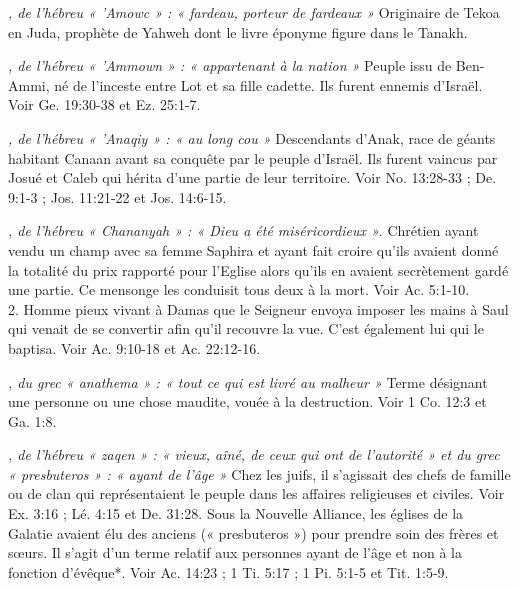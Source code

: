 \begin{multicols}{2}
{\textit{, de l'hébreu « 'Amowc » : « fardeau, porteur de fardeaux »}\newline
Originaire de Tekoa en Juda, prophète de Yahweh dont le livre éponyme figure dans le Tanakh.

\textit{, de l'hébreu « 'Ammown » : « appartenant à la nation »}\newline
Peuple issu de Ben-Ammi, né de l'inceste entre Lot et sa fille cadette. Ils furent ennemis d'Israël. Voir Ge. 19:30-38 et Ez. 25:1-7.

\textit{, de l'hébreu « 'Anaqiy » : « au long cou »}\newline
Descendants d'Anak, race de géants habitant Canaan avant sa conquête par le peuple d'Israël. Ils furent vaincus par Josué et Caleb qui hérita d'une partie de leur territoire. Voir No. 13:28-33 ; De. 9:1-3 ; Jos. 11:21-22 et Jos. 14:6-15.

\textit{, de l'hébreu « Chananyah » : « Dieu a été miséricordieux »}. Chrétien ayant vendu un champ avec sa femme Saphira et ayant fait croire qu'ils avaient donné la totalité du prix rapporté pour l'Eglise alors qu'ils en avaient secrètement gardé une partie. Ce mensonge les conduisit tous deux à la mort. Voir Ac. 5:1-10.
\\2. Homme pieux vivant à Damas que le Seigneur envoya imposer les mains à Saul qui venait de se convertir afin qu'il recouvre la vue. C'est également lui qui le baptisa. Voir Ac. 9:10-18 et Ac. 22:12-16.

\textit{, du grec « anathema » : « tout ce qui est livré au malheur »}\newline
Terme désignant une personne ou une chose maudite, vouée à la destruction. Voir 1 Co. 12:3 et Ga. 1:8.

\textit{, de l'hébreu « zaqen » : « vieux, aîné, de ceux qui ont de l'autorité » et du grec « presbuteros » : « ayant de l'âge »}\newline
Chez les juifs, il s'agissait des chefs de famille ou de clan qui représentaient le peuple dans les affaires religieuses et civiles. Voir Ex. 3:16 ; Lé. 4:15 et De. 31:28. Sous la Nouvelle Alliance, les églises de la Galatie avaient élu des anciens (« presbuteros ») pour prendre soin des frères et sœurs. Il s'agit d'un terme relatif aux personnes ayant de l'âge et non à la fonction d'évêque*. Voir Ac. 14:23 ; 1 Ti. 5:17 ; 1 Pi. 5:1-5 et Tit. 1:5-9.

}
\end{multicols}

